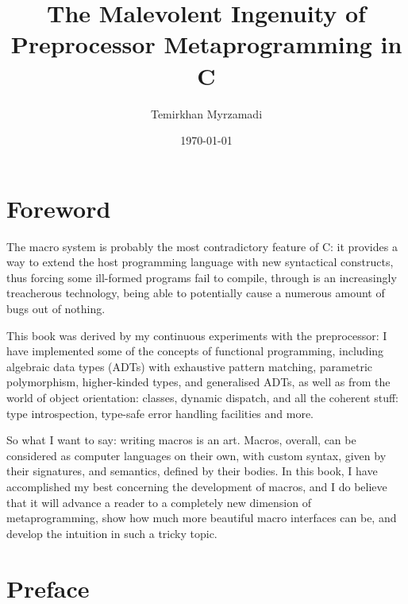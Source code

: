 \documentclass[a4paper, 12pt]{book}
\begin{document}
\title{The Malevolent Ingenuity of Preprocessor Metaprogramming in C}
\author{Temirkhan Myrzamadi}
\date{\today}
\maketitle

\tableofcontents

\newpage

\section{Foreword}

The macro system is probably the most contradictory feature of C: it provides a way to extend
the host programming language with new syntactical constructs, thus forcing some ill-formed programs
fail to compile, through is an increasingly treacherous technology, being able to potentially
cause a numerous amount of bugs out of nothing.

This book was derived by my continuous experiments with the preprocessor: I have implemented some of
the concepts of functional programming, including algebraic data types (ADTs) with exhaustive
pattern matching, parametric polymorphism, higher-kinded types, and generalised ADTs, as well as from
the world of object orientation: classes, dynamic dispatch, and all the coherent stuff: type
introspection, type-safe error handling facilities and more.

So what I want to say: writing macros is an art. Macros, overall, can be considered as computer
languages on their own, with custom syntax, given by their signatures, and semantics, defined by their
bodies. In this book, I have accomplished my best concerning the development of macros, and I
do believe that it will advance a reader to a completely new dimension of metaprogramming, show how
much more beautiful macro interfaces can be, and develop the intuition in such a tricky topic.

\newpage

\section{Preface}
\end{document}
